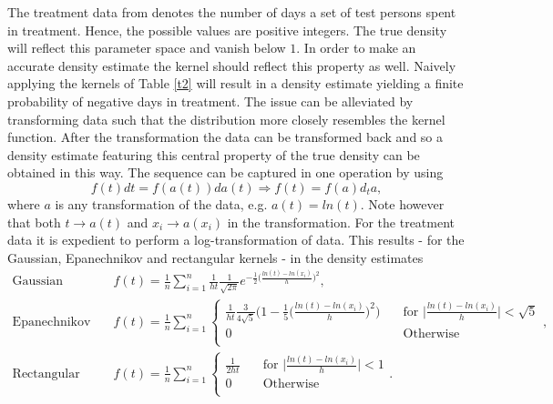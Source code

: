 \begin{example}
	\noindent The treatment data from \citep{silverman} denotes the number of days a set of test persons spent in treatment. Hence, the possible values are positive integers. The true density will reflect this parameter space and vanish below $1$. In order to make an accurate density estimate the kernel should reflect this property as well. Naively applying the kernels of Table \ref{t2} will result in a density estimate yielding a finite probability of negative days in treatment. The issue can be alleviated by transforming data such that the distribution more closely resembles the kernel function. After the transformation the data can be transformed back and so a density estimate featuring this central property of the true density can be obtained in this way. The sequence can be captured in one operation by using
	\begin{equation}
		f(t)dt=f(a(t))da(t)\Rightarrow f(t)=f(a)d_ta,
	\end{equation}
	where $a$ is any transformation of the data, e.g. $a(t)=ln(t)$. Note however that both $t\rightarrow a(t)$ and $x_i\rightarrow a(x_i)$ in the transformation. For the treatment data it is expedient to perform a log-transformation of data. This results - for the Gaussian, Epanechnikov and rectangular kernels - in the density estimates
	\begin{equation}
		\begin{split}
			\text{Gaussian kernel:}&\quad\hat{f}(t)=\frac{1}{n}\sum_{i=1}^n\frac{1}{ht}\frac{1}{\sqrt{2\pi }}e^{-\frac{1}{2}\big(\frac{ln(t)-ln(x_i)}{h}\big)^2},\\
			\text{Epanechnikov kernel:}&\quad\hat{f}(t)=\frac{1}{n}\sum_{i=1}^n\begin{cases}
				\frac{1}{ht}\frac{3}{4\sqrt{5}}\bigg(1-\frac{1}{5}\big(\frac{ln(t)-ln(x_i)}{h}\big)^2\bigg)&\quad \text{for } \big|\frac{ln(t)-ln(x_i)}{h}\big|<\sqrt{5}\\
				0&\quad \text{Otherwise}\\
			\end{cases},\\
			\text{Rectangular kernel:}&\quad\hat{f}(t)=\frac{1}{n}\sum_{i=1}^n\begin{cases}
				\frac{1}{2ht}&\quad \text{for } \big|\frac{ln(t)-ln(x_i)}{h}\big|<1\\
				0&\quad \text{Otherwise}\\
			\end{cases}.\\
		\end{split}

\end{equation}
\end{example}
